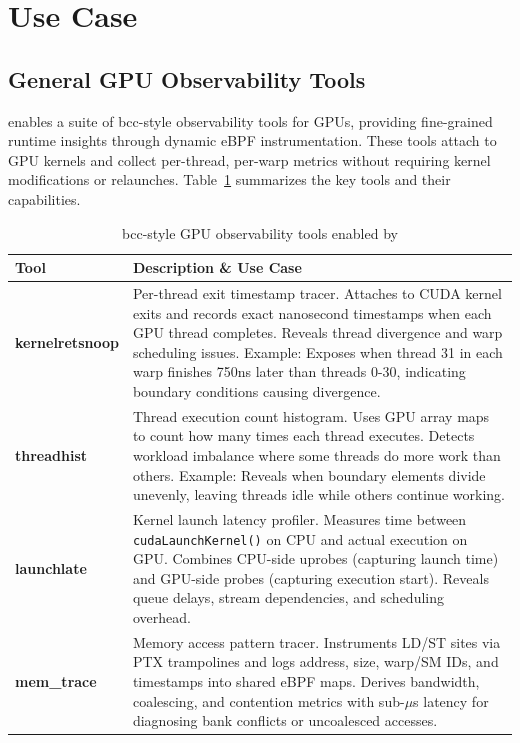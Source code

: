 \section{Use Case}

\subsection{General GPU Observability Tools}\label{sec:use_case_observability}
\noindent \sys enables a suite of bcc-style observability tools for GPUs, providing fine-grained runtime insights through dynamic eBPF instrumentation. These tools attach to GPU kernels and collect per-thread, per-warp metrics without requiring kernel modifications or relaunches. Table~\ref{tab:observability_tools} summarizes the key tools and their capabilities.

\begin{table}[t]
\centering
\small
\begin{tabular}{|p{2.2cm}|p{5.5cm}|}
\hline
\textbf{Tool} & \textbf{Description \& Use Case} \\
\hline
\textbf{kernelretsnoop} &
Per-thread exit timestamp tracer. Attaches to CUDA kernel exits and records exact nanosecond timestamps when each GPU thread completes. Reveals thread divergence and warp scheduling issues. Example: Exposes when thread 31 in each warp finishes 750ns later than threads 0-30, indicating boundary conditions causing divergence. \\
\hline
\textbf{threadhist} &
Thread execution count histogram. Uses GPU array maps to count how many times each thread executes. Detects workload imbalance where some threads do more work than others. Example: Reveals when boundary elements divide unevenly, leaving threads idle while others continue working. \\
\hline
\textbf{launchlate} &
Kernel launch latency profiler. Measures time between \texttt{cudaLaunchKernel()} on CPU and actual execution on GPU. Combines CPU-side uprobes (capturing launch time) and GPU-side probes (capturing execution start). Reveals queue delays, stream dependencies, and scheduling overhead. \\
\hline
\textbf{mem\_trace} &
Memory access pattern tracer. Instruments LD/ST sites via PTX trampolines and logs address, size, warp/SM IDs, and timestamps into shared eBPF maps. Derives bandwidth, coalescing, and contention metrics with sub-\(\mu\)s latency for diagnosing bank conflicts or uncoalesced accesses. \\
\hline
\end{tabular}
\caption{bcc-style GPU observability tools enabled by \sys}
\label{tab:observability_tools}
\end{table}

